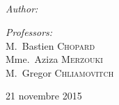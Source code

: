 \begin{titlepage}
\begin{center}
\textsc{\Large \reportsubject}\\[1cm]
\HRule \\[1cm]
{\huge \bfseries \reporttitle}\\[0.5cm]
\HRule \\[2cm]

\begin{minipage}[t]{0.6\textwidth}
  \begin{flushleft} \large
    \emph{Author:}\\
    \reportauthor
  \end{flushleft}
\end{minipage}
\begin{minipage}[t]{0.39\textwidth}
  \begin{flushright} \large
    \emph{Professors:} \\
    M.~Bastien \textsc{ Chopard } \\ %
    Mme.~Aziza \textsc{Merzouki }\\
    M.~Gregor \textsc{Chliamovitch} %
  \end{flushright}
\end{minipage}

\vfill

{\large 21 novembre 2015}

\end{center}

\end{titlepage}

